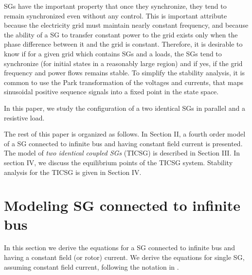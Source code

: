 \documentclass[letterpaper, 10 pt, conference]{ieeeconf}  %
\begin{document}
SGs have the important property that once they synchronize, they tend
to remain synchronized even without any control. This is important
attribute because the electricity grid must maintain nearly constant
frequency, and because the ability of a SG to transfer constant power
to the grid exists only when the phase difference between it and the
grid is constant. Therefore, it is desirable to know if for a given
grid which contains SGs and a loads, the SGs tend to synchronize (for
initial states in a reasonably large region) and if yes, if the grid
frequency and power flows remains stable. To simplify the stability
analysis, it is common to use the Park transformation of the voltages
and currents, that maps sinusoidal positive sequence signals into a
fixed point in the state space.

In this paper, we study the configuration of a two identical SGs in parallel and a resistive  load. 

The rest of this paper is organized as follows. In Section II, a
fourth order model of a SG connected to infinite bus and having
constant field current is presented. The model of {\em two identical coupled SGs} (TICSG) is described in Section III. In section IV, we discuss  the equilibrium points of the TICSG system.
Stability analysis for the TICSG is given in Section IV.

\section{Modeling SG connected to infinite bus}

In this section we derive the equations for a SG connected to infinite
bus and having a constant field (or rotor) current. We derive the equations for single SG, assuming constant field current,
following the notation in \cite{ZhWe:11}. 
\end{document}
